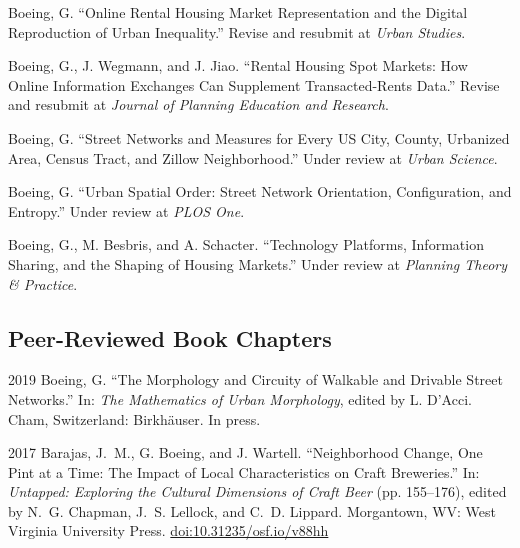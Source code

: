 \documentclass[12pt,letterpaper]{report}
\begin{document}
	\begin{tablist}
		
		\item[\the\year] \tab Boeing, G. \enquote{Online Rental Housing Market Representation and the Digital Reproduction of Urban Inequality.} Revise and resubmit at \textit{Urban Studies}.
		
		\item[\the\year] \tab Boeing, G., J. Wegmann, and J. Jiao. \enquote{Rental Housing Spot Markets: How Online Information Exchanges Can Supplement Transacted-Rents Data.} Revise and resubmit at \textit{Journal of Planning Education and Research}.
		
		\item[\the\year] \tab Boeing, G. \enquote{Street Networks and Measures for Every US City, County, Urbanized Area, Census Tract, and Zillow Neighborhood.} Under review at \textit{Urban Science}.
		
		\item[\the\year] \tab Boeing, G. \enquote{Urban Spatial Order: Street Network Orientation, Configuration, and Entropy.} Under review at \textit{PLOS One}.
		
		\item[\the\year] \tab Boeing, G., M. Besbris, and A. Schacter. \enquote{Technology Platforms, Information Sharing, and the Shaping of Housing Markets.} Under review at \textit{Planning Theory \& Practice}.
		
	\end{tablist}
	
	
	
	\subsection*{Peer-Reviewed Book Chapters}
	
	\begin{tablist}
		
		\item[2019] \tab Boeing, G. \enquote{The Morphology and Circuity of Walkable and Drivable Street Networks.} In: \textit{The Mathematics of Urban Morphology}, edited by L. D'Acci. Cham, Switzerland: Birkhäuser. In press.
		
		\item[2017] \tab Barajas, J.~M., G. Boeing, and J. Wartell. \enquote{Neighborhood Change, One Pint at a Time: The Impact of Local Characteristics on Craft Breweries.} In: \textit{Untapped: Exploring the Cultural Dimensions of Craft Beer} (pp. 155--176), edited by N.~G. Chapman, J.~S. Lellock, and C.~D. Lippard. Morgantown, WV: West Virginia University Press. \href{https://doi.org/10.31235/osf.io/v88hh}{doi:10.31235/osf.io/v88hh}
		
	\end{tablist}
	
\end{document}
